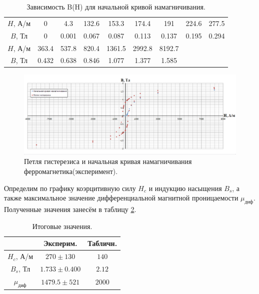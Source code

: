 \documentclass[a4paper, 12pt, twoside]{article}
\begin{document}
\begin{table}[H]
	\centering
	\caption{Зависимость B(H) для начальной кривой намагничивания.}
	\label{zavn}
	\begin{tabular}{c|c|c|c|c|c|c|cc}
		\toprule
		$H$, А/м & 0     & 4.3   & 132.6 & 153.3  & 174.4  & 191    & \multicolumn{1}{c|}{224.6} & \multicolumn{1}{c}{277.5} \\ 
		$B$, Тл  & 0     & 0.001 & 0.067 & 0.087  & 0.113  & 0.137  & \multicolumn{1}{c|}{0.195} & \multicolumn{1}{c}{0.294} \\ \midrule
		$H$, А/м & 363.4 & 537.8 & 820.4 & 1361.5 & 2992.8 & 8192.7 & \multicolumn{2}{c}{\multirow{2}{*}{}}                   \\ 
		$B$, Тл  & 0.432 & 0.638 & 0.846 & 1.077  & 1.377  & 1.585  & \multicolumn{2}{c}{}                                    \\ \bottomrule
	\end{tabular}
\end{table}

\begin{figure}[H]
	\centering
	\includegraphics[width = \textwidth]{graph}
	\caption{Петля гистерезиса и начальная кривая намагничивания ферромагнетика(эксперимент).}
	\label{graph}
\end{figure}

Определим по графику коэрцитивную силу $H_c$ и индукцию насыщения $B_s$, а также максимальное значение дифференциальной магнитной проницаемости $\mu_{\text{диф}}$. Полученные значения занесём в таблицу \ref{itog}.

\begin{table}[H]
	\centering
	\caption{Итоговые значения.}
	\label{itog}
	\begin{tabular}{c|c|c}
		\toprule
		& Эксперим.  & Табличн. \\ \midrule
		$H_c$, А/м        & $270\pm 130$ &    $140$      \\ 
		$B_s$, Тл         & $1.733\pm 0.400$      & $2.12$         \\  
		$\mu_{\text{диф}}$ & $1479.5\pm 521$           & $2000$         \\ \bottomrule
		\end{tabular}
\end{table}
\end{document}
